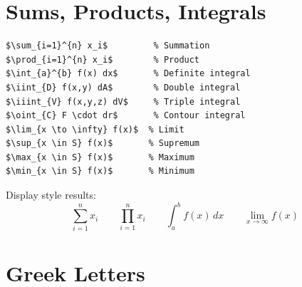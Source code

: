 \section{Sums, Products, Integrals}

\begin{lstlisting}[language={[LaTeX]TeX}, caption=Big operators]
$\sum_{i=1}^{n} x_i$         % Summation
$\prod_{i=1}^{n} x_i$        % Product
$\int_{a}^{b} f(x) dx$       % Definite integral
$\iint_{D} f(x,y) dA$        % Double integral
$\iiint_{V} f(x,y,z) dV$     % Triple integral
$\oint_{C} F \cdot dr$       % Contour integral
$\lim_{x \to \infty} f(x)$  % Limit
$\sup_{x \in S} f(x)$       % Supremum
$\max_{x \in S} f(x)$       % Maximum
$\min_{x \in S} f(x)$       % Minimum
\end{lstlisting}

Display style results:
\[ \sum_{i=1}^{n} x_i \qquad \prod_{i=1}^{n} x_i \qquad \int_{a}^{b} f(x)\,dx \qquad \lim_{x \to \infty} f(x) \]

\section{Greek Letters}

